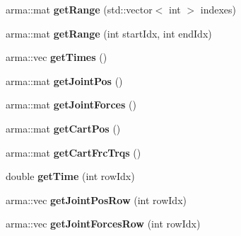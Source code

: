 \begin{DoxyCompactItemize}
\item 
\hypertarget{classkukadu_1_1SensorData_a4bce25340f80cb54c38b15590143602d}{arma\-::mat {\bfseries get\-Range} (std\-::vector$<$ int $>$ indexes)}\label{classkukadu_1_1SensorData_a4bce25340f80cb54c38b15590143602d}

\item 
\hypertarget{classkukadu_1_1SensorData_afd4508a9b24265d7a695f7131c443b1c}{arma\-::mat {\bfseries get\-Range} (int start\-Idx, int end\-Idx)}\label{classkukadu_1_1SensorData_afd4508a9b24265d7a695f7131c443b1c}

\item 
\hypertarget{classkukadu_1_1SensorData_a3cfb89c4bf5c6beb6512eb478e764799}{arma\-::vec {\bfseries get\-Times} ()}\label{classkukadu_1_1SensorData_a3cfb89c4bf5c6beb6512eb478e764799}

\item 
\hypertarget{classkukadu_1_1SensorData_a67da976e625fc3cf63a2533dd928dc26}{arma\-::mat {\bfseries get\-Joint\-Pos} ()}\label{classkukadu_1_1SensorData_a67da976e625fc3cf63a2533dd928dc26}

\item 
\hypertarget{classkukadu_1_1SensorData_a4d00473768440cec0fae061a39edf1c8}{arma\-::mat {\bfseries get\-Joint\-Forces} ()}\label{classkukadu_1_1SensorData_a4d00473768440cec0fae061a39edf1c8}

\item 
\hypertarget{classkukadu_1_1SensorData_ac15ea28f157a22b8144e2099127e4a15}{arma\-::mat {\bfseries get\-Cart\-Pos} ()}\label{classkukadu_1_1SensorData_ac15ea28f157a22b8144e2099127e4a15}

\item 
\hypertarget{classkukadu_1_1SensorData_a512395b5d0a4a72ff80625d81e97c54f}{arma\-::mat {\bfseries get\-Cart\-Frc\-Trqs} ()}\label{classkukadu_1_1SensorData_a512395b5d0a4a72ff80625d81e97c54f}

\item 
\hypertarget{classkukadu_1_1SensorData_aa5ed98fb3d3278c7d295d2bd17e744de}{double {\bfseries get\-Time} (int row\-Idx)}\label{classkukadu_1_1SensorData_aa5ed98fb3d3278c7d295d2bd17e744de}

\item 
\hypertarget{classkukadu_1_1SensorData_a64834aa2eff88e5af2264f610acaa838}{arma\-::vec {\bfseries get\-Joint\-Pos\-Row} (int row\-Idx)}\label{classkukadu_1_1SensorData_a64834aa2eff88e5af2264f610acaa838}

\item 
\hypertarget{classkukadu_1_1SensorData_a4635d5f1dd53cc3eced94b7e0ff5a8b7}{arma\-::vec {\bfseries get\-Joint\-Forces\-Row} (int row\-Idx)}\label{classkukadu_1_1SensorData_a4635d5f1dd53cc3eced94b7e0ff5a8b7}


\end{DoxyCompactItemize}
